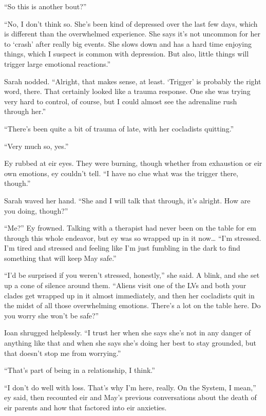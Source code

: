 ``So this is another bout?''

``No, I don't think so. She's been kind of depressed over the last few days, which is different than the overwhelmed experience. She says it's not uncommon for her to `crash' after really big events. She slows down and has a hard time enjoying things, which I suspect is common with depression. But also, little things will trigger large emotional reactions.''

Sarah nodded. ``Alright, that makes sense, at least. `Trigger' is probably the right word, there. That certainly looked like a trauma response. One she was trying very hard to control, of course, but I could almost see the adrenaline rush through her.''

``There's been quite a bit of trauma of late, with her cocladists quitting.''

``Very much so, yes.''

Ey rubbed at eir eyes. They were burning, though whether from exhaustion or eir own emotions, ey couldn't tell. ``I have no clue what was the trigger there, though.''

Sarah waved her hand. ``She and I will talk that through, it's alright. How are you doing, though?''

``Me?'' Ey frowned. Talking with a therapist had never been on the table for em through this whole endeavor, but ey was so wrapped up in it now\ldots{} ``I'm stressed. I'm tired and stressed and feeling like I'm just fumbling in the dark to find something that will keep May safe.''

``I'd be surprised if you weren't stressed, honestly,'' she said. A blink, and she set up a cone of silence around them. ``Aliens visit one of the LVs and both your clades get wrapped up in it almost immediately, and then her cocladists quit in the midst of all those overwhelming emotions. There's a lot on the table here. Do you worry she won't be safe?''

Ioan shrugged helplessly. ``I trust her when she says she's not in any danger of anything like that and when she says she's doing her best to stay grounded, but that doesn't stop me from worrying.''

``That's part of being in a relationship, I think.''

``I don't do well with loss. That's why I'm here, really. On the System, I mean,'' ey said, then recounted eir and May's previous conversations about the death of eir parents and how that factored into eir anxieties.

